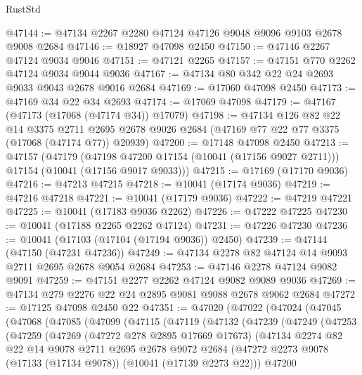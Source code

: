 \begin{lexlean}{RustStd}
\begin{coremodule}
@47144 := @47134 @2267 @2280 @47124 @47126 @9048 @9096 @9103 @2678 @9008 @2684
@47146 := @18927 @47098 @2450
@47150 := @47146 @2267 @47124 @9034 @9046
@47151 := @47121 @2265
@47157 := @47151 @770 @2262 @47124 @9034 @9044 @9036
@47167 := @47134 @80 @342 @22 @24 @2693 @9033 @9043 @2678 @9016 @2684
@47169 := @17060 @47098 @2450
@47173 := @47169 @34 @22 @34 @2693
@47174 := @17069 @47098
@47179 := @47167 (@47173 (@17068 (@47174 @34)) @17079)
@47198 := @47134
    @126
    @82
    @22
    @14
    @3375
    @2711
    @2695
    @2678
    @9026
    @2684
    (@47169 @77 @22 @77 @3375 (@17068 (@47174 @77)) @20939)
@47200 := @17148 @47098 @2450
@47213 := @47157
    (@47179
      (@47198 @47200 @17154 (@10041 (@17156 @9027 @2711)))
      @17154
      (@10041 (@17156 @9017 @9033)))
@47215 := @17169 (@17170 @9036)
@47216 := @47213 @47215
@47218 := @10041 (@17174 @9036)
@47219 := @47216 @47218
@47221 := @10041 (@17179 @9036)
@47222 := @47219 @47221
@47225 := @10041 (@17183 @9036 @2262)
@47226 := @47222 @47225
@47230 := @10041 (@17188 @2265 @2262 @47124)
@47231 := @47226 @47230
@47236 := @10041 (@17103 (@17104 (@17194 @9036)) @2450)
@47239 := @47144 (@47150 (@47231 @47236))
@47249 := @47134 @2278 @82 @47124 @14 @9093 @2711 @2695 @2678 @9054 @2684
@47253 := @47146 @2278 @47124 @9082 @9091
@47259 := @47151 @2277 @2262 @47124 @9082 @9089 @9036
@47269 := @47134 @279 @2276 @22 @24 @2895 @9081 @9088 @2678 @9062 @2684
@47272 := @17125 @47098 @2450 @22
@47351 := @47020
    (@47022
      (@47024
        (@47045
          (@47068
            (@47085
              (@47099
                (@47115
                  (@47119
                    (@47132
                      (@47239
                        (@47249
                          (@47253
                            (@47259
                              (@47269
                                (@47272 @278 @2895 @17669 @17673)
                                (@47134
                                  @2274
                                  @82
                                  @22
                                  @14
                                  @9078
                                  @2711
                                  @2695
                                  @2678
                                  @9072
                                  @2684
                                  (@47272
                                    @2273
                                    @9078
                                    (@17133 (@17134 @9078))
                                    (@10041 (@17139 @2273 @22)))
                                  @47200

\end{coremodule}
\end{lexlean}

